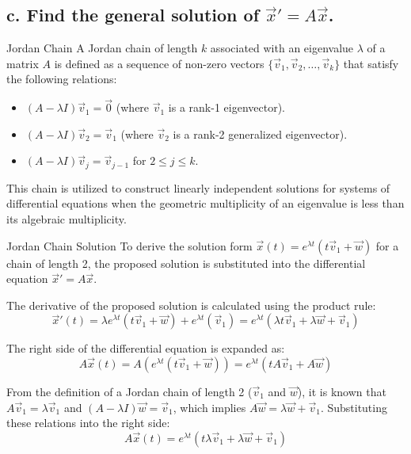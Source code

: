 \begin{enumerate}
  \subsection*{c. Find the general solution of $\vec{x}' = A\vec{x}$.}
\begin{define}{Jordan Chain}
  A Jordan chain of length $k$ associated with an eigenvalue $\lambda$ of a matrix $A$ is defined as a sequence of non-zero vectors $\{\vec{v}_1, \vec{v}_2, \dots, \vec{v}_k\}$ that satisfy the following relations:
  \begin{itemize}
    \item $(A - \lambda I)\vec{v}_1 = \vec{0}$ (where $\vec{v}_1$ is a rank-1 eigenvector).
    \item $(A - \lambda I)\vec{v}_2 = \vec{v}_1$ (where $\vec{v}_2$ is a rank-2 generalized eigenvector).
    \item $(A - \lambda I)\vec{v}_j = \vec{v}_{j-1}$ for $2 \leq j \leq k$.
  \end{itemize}
  This chain is utilized to construct linearly independent solutions for systems of differential equations when the geometric multiplicity of an eigenvalue is less than its algebraic multiplicity.
\end{define}



\begin{define}{Jordan Chain Solution}
  To derive the solution form $\vec{x}(t) = e^{\lambda t}(t\vec{v}_1 + \vec{w})$ for a chain of length 2, the proposed solution is substituted into the differential equation $\vec{x}' = A\vec{x}$.
  
  The derivative of the proposed solution is calculated using the product rule:
  \[
  \vec{x}'(t) = \lambda e^{\lambda t}(t\vec{v}_1 + \vec{w}) + e^{\lambda t}(\vec{v}_1) = e^{\lambda t}(\lambda t \vec{v}_1 + \lambda \vec{w} + \vec{v}_1)
  \]
  
  The right side of the differential equation is expanded as:
  \[
  A\vec{x}(t) = A(e^{\lambda t}(t\vec{v}_1 + \vec{w})) = e^{\lambda t}(t A\vec{v}_1 + A\vec{w})
  \]
  
  From the definition of a Jordan chain of length 2 ($\vec{v}_1$ and $\vec{w}$), it is known that $A\vec{v}_1 = \lambda \vec{v}_1$ and $(A - \lambda I)\vec{w} = \vec{v}_1$, which implies $A\vec{w} = \lambda \vec{w} + \vec{v}_1$. Substituting these relations into the right side:
  \[
  A\vec{x}(t) = e^{\lambda t}(t \lambda \vec{v}_1 + \lambda \vec{w} + \vec{v}_1)
  \]
  

\end{define}
\end{enumerate}
